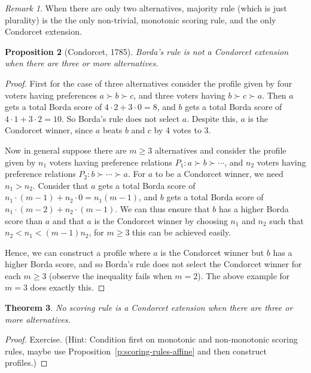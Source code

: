 \documentclass{book}
\theoremstyle{plain}
\newtheorem{theorem}{Theorem}[subsection]
\newtheorem{proposition}[theorem]{Proposition}
\theoremstyle{definition}
\theoremstyle{remark}
\newtheorem{remark}[theorem]{Remark}
\begin{document}
\begin{remark}
    When there are only two alternatives, majority rule
    (which is just plurality) is the 
    the only non-trivial, monotonic scoring rule, 
    and the only Condorcet extension.
\end{remark}

\begin{proposition}[Condorcet, 1785]
    Borda's rule is not a Condorcet extension
    when there are three or more alternatives.
\end{proposition}
\begin{proof}
    First for the case of three alternatives consider the profile
    given by 
    four voters having preferences 
    $a \succ b \succ c$,
    and three voters having 
    $b \succ c \succ a$.
    Then $a$ gets a total Borda score of $4 \cdot 2 + 3 \cdot 0 = 8$,
    and $b$ gets a total Borda score of $4 \cdot 1 + 3 \cdot 2 = 10$.
    So Borda's rule does not select $a$. 
    Despite this, $a$ is the Condorcet winner, since $a$ beats $b$  and $c$ by 4 votes to 3.

    Now in general suppose there are 
    $m \geq 3$ alternatives and consider the profile given by 
    $n_1$ voters having 
    preference relations $P_1: a \succ b \succ \cdots$,
    and $n_2$ voters having
    preference relations $P_2: b \succ  \cdots \succ a$.
    For $a$ to be a Condorcet winner, we need $n_1 > n_2$.
    Consider that 
    $a$ gets a total Borda score of 
    $n_1 \cdot (m - 1) + n_2 \cdot 0 = n_1(m - 1)$,
    and $b$ gets a total Borda score of
    $n_1 \cdot (m - 2) + n_2 \cdot (m - 1)$.
    We can thus ensure that $b$ has a higher 
    Borda score than $a$ and that 
    $a$ is the Condorcet winner by choosing $n_1$ and $n_2$ such that
    $n_2 < n_1 < (m-1)n_2$, 
    for $m \geq 3$ this can be achieved easily.

    Hence, we can construct a profile where $a$ is the Condorcet winner but $b$ has a higher Borda score,
    and so Borda's rule does not select the Condorcet winner for 
    each $m \geq 3$ (observe the inequality fails when $m = 2$).
    The above example for $m = 3$ does exactly this.
\end{proof}

\begin{theorem}
    No scoring rule is a Condorcet extension when 
    there are three or more alternatives.
\end{theorem}
\begin{proof}
    Exercise.
    (Hint: Condition first on monotonic and non-monotonic scoring rules,
    maybe use Proposition~\ref{p:scoring-rules-affine}
    and then construct profiles.)
\end{proof}
\end{document}
